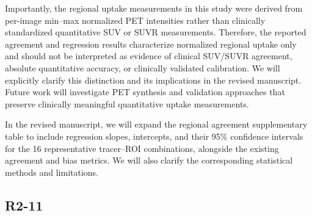 {Importantly, the regional uptake measurements in this study were derived from per-image min–max normalized PET intensities rather than clinically standardized quantitative SUV or SUVR measurements. Therefore, the reported agreement and regression results characterize normalized regional uptake only and should not be interpreted as evidence of clinical SUV/SUVR agreement, absolute quantitative accuracy, or clinically validated calibration. We will explicitly clarify this distinction and its implications in the revised manuscript. Future work will investigate PET synthesis and validation approaches that preserve clinically meaningful quantitative uptake measurements.

In the revised manuscript, we will expand the regional agreement supplementary table to include regression slopes, intercepts, and their 95\% confidence intervals for the 16 representative tracer–ROI combinations, alongside the existing agreement and bias metrics. We will also clarify the corresponding statistical methods and limitations.}



\subsection*{R2-11}

